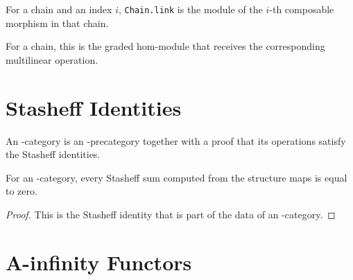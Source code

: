 \begin{definition}
\label{AInfinityCategoryTheory.AInfinityPreCategory.Chain.link}
{}
For a chain and an index $i$,
\texttt{Chain.link} is the module of
the $i$-th composable morphism in that chain.
\end{definition}

\begin{definition}
\label{AInfinityCategoryTheory.AInfinityPreCategory.Chain.operationTarget}
{}
For a chain, this is the graded hom-module that receives the corresponding
multilinear operation.
\end{definition}

\section{Stasheff Identities}

\begin{definition}
\label{AInfinityTheory.AInfinityCategory}
\leanok
{}
An \Ainf{}-category is an \Ainf{}-precategory together with a proof that its
operations satisfy the Stasheff identities.
\end{definition}

\begin{lemma}
\label{AInfinityTheory.AInfinityCategory.indexedStasheffSum_eq_zero}
\leanok
{}
For an \Ainf{}-category, every Stasheff sum computed from the structure maps is
equal to zero.
\end{lemma}
\begin{proof}
\leanok
This is the Stasheff identity that is part of the data of an \Ainf{}-category.
\end{proof}

\section{A-infinity Functors}

